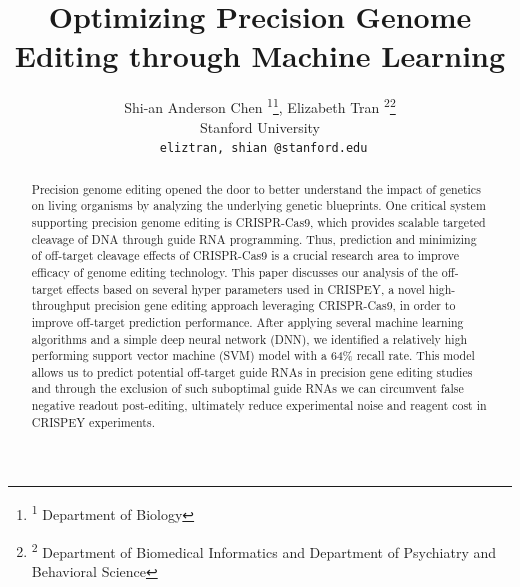 \documentclass[journal]{IEEEtran}
\begin{document}
\title{Optimizing Precision Genome Editing through Machine Learning}


\author{Shi-an Anderson Chen \textsuperscript{1}\thanks{\noindent\textsuperscript{1} Department of Biology}, Elizabeth Tran \textsuperscript{2}\thanks{\noindent\textsuperscript{2} Department of Biomedical Informatics and Department of Psychiatry and Behavioral Science}  \\
Stanford University \\
{\tt\small { eliztran, shian @stanford.edu}}\\
}
\maketitle

\begin{abstract}
Precision genome editing opened the door to better understand the impact of genetics on living organisms by analyzing the underlying genetic blueprints. One critical system supporting precision genome editing is CRISPR-Cas9, which provides scalable targeted cleavage of DNA through guide RNA programming. Thus, prediction and minimizing of off-target cleavage effects of CRISPR-Cas9 is a crucial research area to improve efficacy of genome editing technology. This paper discusses our analysis of the off-target effects based on several hyper parameters used in CRISPEY, a novel high-throughput precision gene editing approach leveraging CRISPR-Cas9, in order to improve off-target prediction performance. After applying several machine learning algorithms and a simple deep neural network (DNN), we identified a relatively high performing support vector machine (SVM) model with a 64$\%$ recall rate. This model allows us to predict potential off-target guide RNAs in precision gene editing studies and through the exclusion of such suboptimal guide RNAs we can circumvent false negative readout post-editing, ultimately reduce experimental noise and reagent cost in CRISPEY experiments.
\end{abstract}
\end{document}
